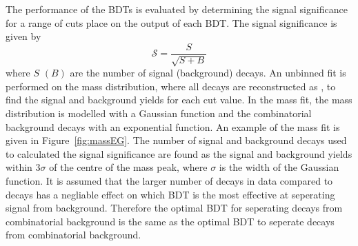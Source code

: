 The performance of the BDTs is evaluated by determining the signal significance for a range of cuts place on the output of each BDT. The signal significance is given by
\begin{equation}
\mathcal{S} = \frac{S}{\sqrt{S+B}}
\label{eq:SigSigf}
\end{equation}
where $S$ $(B)$ are the number of signal (background) decays.
An unbinned \ml fit is performed on the \bhh mass distribution, where all \bhh decays are reconstructed as \bsmumu, to find the signal and background yields for each cut value. %
In the mass fit, the \bhh mass distribution is modelled with a Gaussian function and the combinatorial background decays with an exponential function. An example of the mass fit is given in Figure~\ref{fig:massEG}. 
The number of signal and background decays used to calculated the signal significance are found as the signal and background yields within 3$\sigma$ of the centre of the \bhh mass peak, where $\sigma$ is the width of the Gaussian function. It is assumed that the larger number of \bhh decays in data compared to \bmumu decays has a negliable effect on which BDT is the most effective at seperating signal from background. Therefore the optimal BDT for seperating \bhh decays from combinatorial background is the same as the optimal BDT to seperate \bmumu decays from combinatorial background. %

